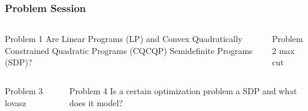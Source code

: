 \documentclass[11pt]{beamer}
\begin{document}
	\begin{frame}
		\frametitle{Problem Session}
		\begin{columns}
			\begin{column}{0.5\textwidth}
				\begin{block}{Problem 1}
					Are Linear Programs (LP) and Convex Quadratically Constrained Quadratic Programs (CQCQP) Semidefinite Programs (SDP)?
				\end{block}
			\end{column}
			\begin{column}{0.5\textwidth}
				\begin{block}{Problem 2}
					max cut
				\end{block}
			\end{column}
		\end{columns}
		\begin{columns}
			\begin{column}{0.5\textwidth}
				\begin{block}{Problem 3}
					lovasz
				\end{block}
			\end{column}
			\begin{column}{0.5\textwidth}
				\begin{block}{Problem 4}
					\vspace{4.4ex} Is a certain optimization problem a SDP and what does it model?\vspace{4.5ex}
				\end{block}
			\end{column}
		\end{columns}
	\end{frame}
\end{document}
